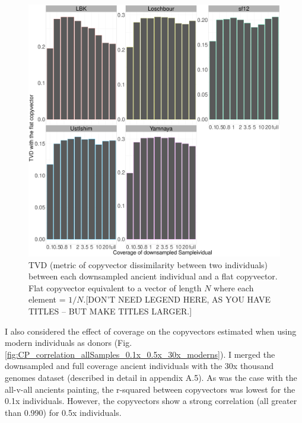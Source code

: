 \begin{figure}[htp]
    \centering
    \includegraphics[width=1.0\textwidth]{../images/chapter1/TVD_ancients_flat_prior.pdf}
    \caption{TVD (metric of copyvector dissimilarity between two individuals) between each downsampled ancient individual and a flat copyvector. Flat copyvector equivalent to a vector of length $N$ where each element = $1/N$.{\color{red}[DON'T NEED LEGEND HERE, AS YOU HAVE TITLES -- BUT MAKE TITLES LARGER.]}}
    \label{fig:TVD_ancients_flat_prior}
\end{figure}

I also considered the effect of coverage on the copyvectors estimated when using modern individuals as donors (Fig. \ref{fig:CP_correlation_allSamples_0.1x_0.5x_30x_moderns}). I merged the downsampled and full coverage ancient individuals with the 30x thousand genomes dataset (described in detail in appendix A.5). As was the case with the all-v-all ancients painting, the r-squared between copyvectors was lowest for the 0.1x individuals. However, the copyvectors show a strong correlation (all greater than 0.990) for 0.5x individuals. 

